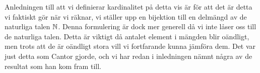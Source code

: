 Anledningen till att vi definierar kardinalitet på detta vis är för att det är 
detta vi faktiskt gör när vi räknar, vi ställer upp en bijektion till en 
delmängd av de naturliga talen \(\mathbb{N}\).
Denna formulering är dock mer generell då vi inte låser oss till de naturliga 
talen.
Detta är viktigt då antalet element i mängden blir oändligt, men trots att de 
är oändligt stora vill vi fortfarande kunna jämföra dem.
Det var just detta som Cantor gjorde, och vi har redan i inledningen nämnt
några av de resultat som han kom fram till.
